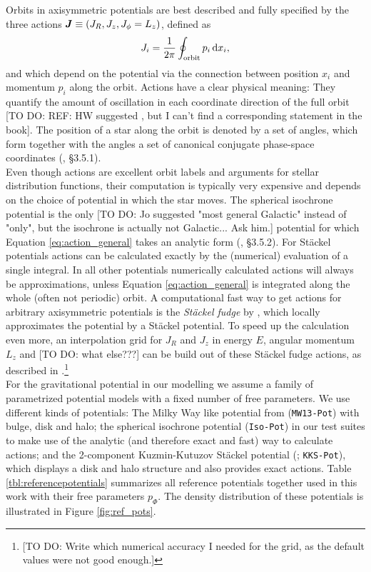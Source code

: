 
Orbits in axisymmetric potentials are best described and fully specified by the three actions $\boldsymbol{J} \equiv (J_R, J_z, J_\phi=L_z)$, defined as
\begin{equation}
J_i = \frac{1}{2\pi} \oint_\text{orbit} p_i \mathop{}\!\mathrm{d} x_i, \label{eq:action_general}
\end{equation}
and which depend on the potential via the connection between position $x_i$ and momentum $p_i$ along the orbit. Actions have a clear physical meaning: They quantify the amount of oscillation in each coordinate direction of the full orbit [TO DO: REF: HW suggested \citet{bin08}, but I can't find a corresponding statement in the book]. The position of a star along the orbit is denoted by a set of angles, which form together with the angles a set of canonical conjugate phase-space coordinates (\citealt{bin08}, \S 3.5.1). \\

Even though actions are excellent orbit labels and arguments for stellar distribution functions, their computation is typically very expensive and depends on the choice of potential in which the star moves. The spherical isochrone potential \citep{1959AnAp...22..126H} is the only [TO DO: Jo suggested "most general Galactic" instead of "only", but the isochrone is actually not Galactic... Ask him.] potential for which Equation \ref{eq:action_general} takes an analytic form (\citealt{bin08}, \S 3.5.2). For St\"{a}ckel potentials actions can be calculated exactly by the (numerical) evaluation of a single integral. In all other potentials numerically calculated actions will always be approximations, unless Equation \ref{eq:action_general} is integrated along the whole (often not periodic) orbit.  A computational fast way to get actions for arbitrary axisymmetric potentials is the \emph{St\"{a}ckel fudge} by \citet{bin12}, which locally approximates the potential by a St\"{a}ckel potential. To speed up the calculation even more, an interpolation grid for $J_R$ and $J_z$ in energy $E$, angular momentum $L_z$ and [TO DO: what else???] can be build out of these St\"{a}ckel fudge actions, as described in \citet{bov15}.\footnote{[TO DO: Write which numerical accuracy I needed for the grid, as the default values were not good enough.]} \\

For the gravitational potential in our modelling we assume a family of parametrized potential models with a fixed number of free parameters. We use different kinds of potentials: The Milky Way like potential from \citet{bov13} (\texttt{MW13-Pot}) with bulge, disk and halo; the spherical isochrone potential (\texttt{Iso-Pot}) in our test suites to make use of the analytic (and therefore exact and fast) way  to calculate actions; and the 2-component Kuzmin-Kutuzov St\"{a}ckel potential (\citealt{bat94}; \texttt{KKS-Pot}), which displays a disk and halo structure and also provides exact actions. Table \ref{tbl:referencepotentials} summarizes all reference potentials together used in this work with their free parameters $p_\Phi$. The density distribution of these potentials is illustrated in Figure \ref{fig:ref_pots}.\\

